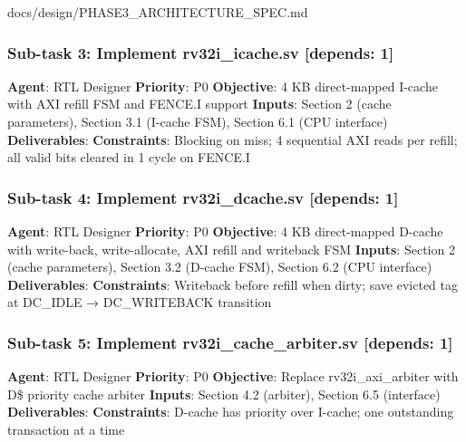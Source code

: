 \begin{relocated}{docs/design/PHASE3_ARCHITECTURE_SPEC.md}
\subsubsection{\texorpdfstring{Sub-task 3: Implement
rv32i\_\allowbreak{}icache.sv {[}depends:
1{]}}{Sub-task 3: Implement rv32i\_icache.sv {[}depends: 1{]}}}\label{ds:ch:phase3-architecture:sub-task-3-implement-rv32i-icachesv-depends-1}

\textbf{Agent}: RTL Designer \textbf{Priority}: P0 \textbf{Objective}: 4
KB direct-mapped I-cache with AXI refill FSM and FENCE.I support
\textbf{Inputs}: Section 2 (cache parameters), Section 3.1 (I-cache
FSM), Section 6.1 (CPU interface) \textbf{Deliverables}:
 \textbf{Constraints}: Blocking on miss; 4
sequential AXI reads per refill; all valid bits cleared in 1 cycle on
FENCE.I

\subsubsection{\texorpdfstring{Sub-task 4: Implement
rv32i\_\allowbreak{}dcache.sv {[}depends:
1{]}}{Sub-task 4: Implement rv32i\_dcache.sv {[}depends: 1{]}}}\label{ds:ch:phase3-architecture:sub-task-4-implement-rv32i-dcachesv-depends-1}

\textbf{Agent}: RTL Designer \textbf{Priority}: P0 \textbf{Objective}: 4
KB direct-mapped D-cache with write-back, write-allocate, AXI refill and
writeback FSM \textbf{Inputs}: Section 2 (cache parameters), Section 3.2
(D-cache FSM), Section 6.2 (CPU interface) \textbf{Deliverables}:
 \textbf{Constraints}: Writeback before
refill when dirty; save evicted tag at DC\_IDLE →
DC\_\allowbreak{}WRITEBACK transition

\subsubsection{\texorpdfstring{Sub-task 5: Implement
rv32i\_\allowbreak{}cache\_\allowbreak{}arbiter.sv {[}depends:
1{]}}{Sub-task 5: Implement rv32i\_cache\_arbiter.sv {[}depends: 1{]}}}\label{ds:ch:phase3-architecture:sub-task-5-implement-rv32i-cache-arbitersv-depends-1}

\textbf{Agent}: RTL Designer \textbf{Priority}: P0 \textbf{Objective}:
Replace rv32i\_\allowbreak{}axi\_\allowbreak{}arbiter with D\$ priority
cache arbiter \textbf{Inputs}: Section 4.2 (arbiter), Section 6.5
(interface) \textbf{Deliverables}: 
\textbf{Constraints}: D-cache has priority over I-cache; one outstanding
transaction at a time


\end{relocated}
